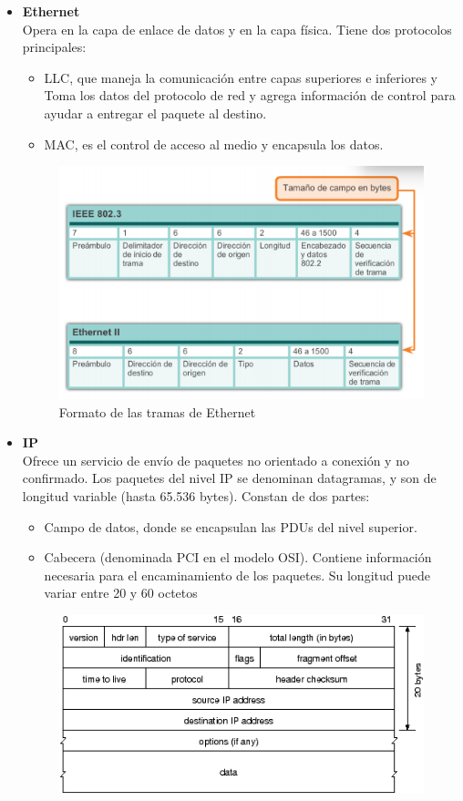 \documentclass[a4paper,12pt]{article}
\begin{document}
\begin{enumerate}
 \begin{itemize}
  \item \textbf{Ethernet} \\
  Opera en la capa de enlace de datos y en la capa física. Tiene dos protocolos principales:
  \begin{itemize}
   \item LLC, que maneja la comunicación entre capas superiores e inferiores y Toma los datos del protocolo de red y agrega información de control para ayudar a entregar el paquete al destino.
   \item MAC, es el control de acceso al medio y encapsula los datos.
  \end{itemize}
  \begin{figure}[H]
   \centering
   \includegraphics[scale = 0.5]{15.png}
   \caption{Formato de las tramas de Ethernet}
  \end{figure}
  \item \textbf{IP} \\
  Ofrece un servicio de envío de paquetes no orientado a conexión y no confirmado. Los paquetes del nivel IP se denominan datagramas, y son de longitud variable (hasta 65.536 bytes). Constan de dos partes:
  \begin{itemize}
   \item Campo de datos, donde se encapsulan las PDUs del nivel superior.
   \item Cabecera (denominada PCI en el modelo OSI). Contiene información necesaria para el encaminamiento de los paquetes. Su longitud puede variar entre 20 y 60 octetos
  \end{itemize}
  \begin{figure}[H]
   \centering
   \includegraphics[scale = 0.6]{16.png}

\end{figure}
\end{itemize}
\end{enumerate}
\end{document}
